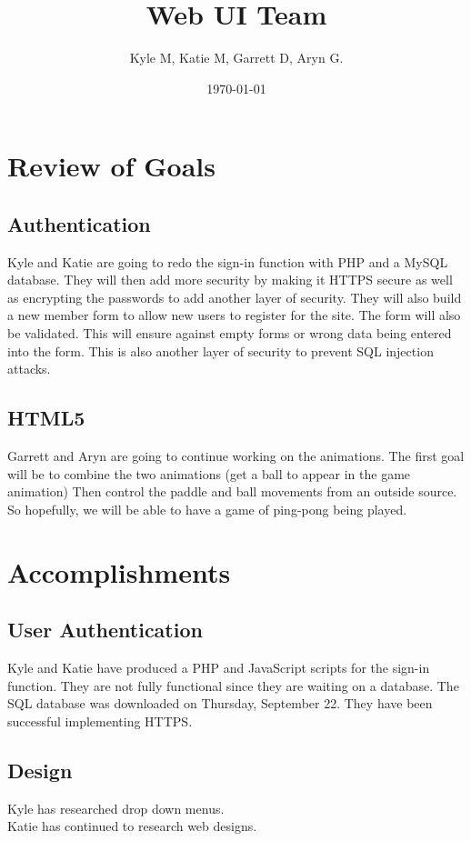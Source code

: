 




\title{Web UI Team}
\author{Kyle M, Katie M, Garrett D, Aryn G.}
\date{\today}
\maketitle


\section{Review of Goals}
	\subsection{Authentication}
	Kyle and Katie are going to redo the sign-in function with PHP and a MySQL database. They will then add more security  by making it HTTPS secure as well as encrypting the passwords to add another layer of security. They will also build a new member form to allow new users to register for the site. The form will also be validated. This will ensure against empty forms or wrong data being entered into the form. This is also another layer of security to prevent SQL injection attacks.
	\subsection{HTML5}
	Garrett and Aryn are going to continue working on the animations. The first goal will be to combine the two animations (get a ball to appear in the game animation) Then control the paddle and ball movements from an outside source. So hopefully, we will be able to have a game of ping-pong being played. 

\section{Accomplishments}
	\subsection{User Authentication}
	Kyle and Katie have produced a PHP and JavaScript scripts for the sign-in function. They are not fully functional since they are waiting on a database. The SQL database was downloaded on Thursday, September 22. They have been successful implementing HTTPS.
	\subsection{Design}
	 Kyle has researched drop down menus.\\Katie has continued to research web designs.
